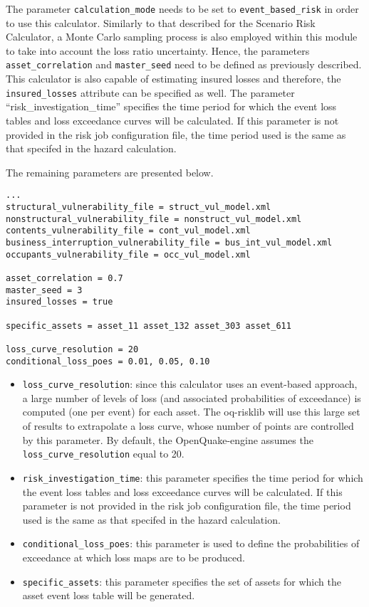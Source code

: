 The parameter \Verb+calculation_mode+ needs to be set to
\Verb+event_based_risk+ in order to use this calculator. Similarly to that
described for the Scenario Risk Calculator, a Monte Carlo sampling process is
also employed within this module to take into account the loss ratio
uncertainty. Hence, the parameters \Verb+asset_correlation+ and
\Verb+master_seed+ need to be defined as previously described. This calculator
is also capable of estimating insured losses and therefore, the
\Verb+insured_losses+ attribute can be specified as well. The parameter
``risk\_investigation\_time'' specifies the time period for which the event
loss tables and loss exceedance curves will be calculated. If this parameter
is not provided in the risk job configuration file, the time period used is
the same as that specifed in the hazard calculation.

The remaining parameters are presented below.

\begin{Verbatim}[frame=single, commandchars=\\\{\}, samepage=true]
...
structural_vulnerability_file = struct_vul_model.xml
nonstructural_vulnerability_file = nonstruct_vul_model.xml
contents_vulnerability_file = cont_vul_model.xml
business_interruption_vulnerability_file = bus_int_vul_model.xml
occupants_vulnerability_file = occ_vul_model.xml

asset_correlation = 0.7
master_seed = 3
insured_losses = true

specific_assets = asset_11 asset_132 asset_303 asset_611

loss_curve_resolution = 20
conditional_loss_poes = 0.01, 0.05, 0.10
\end{Verbatim}

\begin{itemize}

  \item \Verb+loss_curve_resolution+: since this calculator uses an event-based
    approach, a large number of levels of loss (and associated probabilities of
    exceedance) is computed (one per event) for each asset. The oq-risklib will
    use this large set of results to extrapolate a loss curve, whose number of
    points are controlled by this parameter. By default, the OpenQuake-engine
    assumes the \Verb+loss_curve_resolution+ equal to 20.

  \item \Verb+risk_investigation_time+: this parameter specifies the time
    period for which the event loss tables and loss exceedance curves will be
    calculated. If this parameter is not provided in the risk job configuration
    file, the time period used is the same as that specifed in the hazard
    calculation.

  \item \Verb+conditional_loss_poes+: this parameter is used to define the
    probabilities of exceedance at which loss maps are to be produced.

  \item \Verb+specific_assets+: this parameter specifies the set of assets for
    which the asset event loss table will be generated.

\end{itemize}
